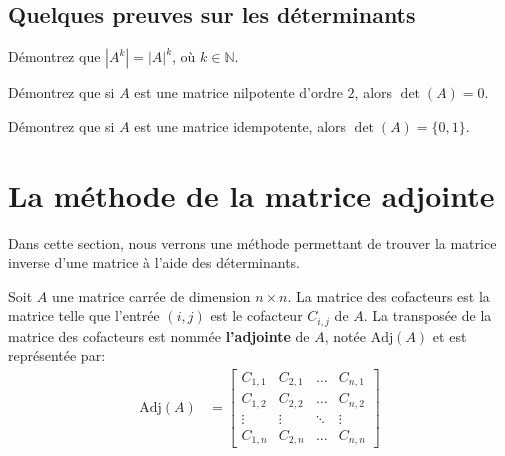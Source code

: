 \documentclass[]{book}
\theoremstyle{definition}
\theoremstyle{definition}
\theoremstyle{definition}
\theoremstyle{remark}
\let\BeginKnitrBlock\begin \let\EndKnitrBlock\end
\begin{document}
\hypertarget{quelques-preuves-sur-les-duxe9terminants}{%
\subsection{Quelques preuves sur les déterminants}\label{quelques-preuves-sur-les-duxe9terminants}}

\BeginKnitrBlock{example}
\protect\hypertarget{exm:unnamed-chunk-109}{}{\label{exm:unnamed-chunk-109} }Démontrez que \(|A^k| = |A|^k\), où \(k\in\mathbb{N}\).
\EndKnitrBlock{example}

\BeginKnitrBlock{example}
\protect\hypertarget{exm:unnamed-chunk-110}{}{\label{exm:unnamed-chunk-110} }Démontrez que si \(A\) est une matrice nilpotente d'ordre \(2\), alors \(\det(A)=0\).
\EndKnitrBlock{example}

\BeginKnitrBlock{example}
\protect\hypertarget{exm:unnamed-chunk-111}{}{\label{exm:unnamed-chunk-111} }Démontrez que si \(A\) est une matrice idempotente, alors \(\det(A)=\{0,1\}\).
\EndKnitrBlock{example}

\hypertarget{la-muxe9thode-de-la-matrice-adjointe}{%
\section{La méthode de la matrice adjointe}\label{la-muxe9thode-de-la-matrice-adjointe}}

Dans cette section, nous verrons une méthode permettant de trouver la matrice inverse d'une matrice à l'aide des déterminants.

\BeginKnitrBlock{definition}[L'adjointe de la matrice $A$]
\protect\hypertarget{def:unnamed-chunk-112}{}{\label{def:unnamed-chunk-112} {} }Soit \(A\) une matrice carrée de dimension \(n \times n\). La matrice des cofacteurs est la matrice telle que l'entrée \((i,j)\) est le cofacteur \(C_{i,j}\) de \(A\). La transposée de la matrice des cofacteurs est nommée \textbf{l'adjointe} de \(A\), notée \(\text{Adj}(A)\) et est représentée par:
\begin{align*}
\text{Adj}(A) &= \begin{bmatrix}
C_{1,1} & C_{2,1} & \ldots & C_{n,1} \\
C_{1,2} & C_{2,2} & \ldots & C_{n,2} \\
\vdots & \vdots & \ddots & \vdots \\
C_{1,n} & C_{2,n} & \ldots & C_{n,n}
\end{bmatrix}
\end{align*}
\EndKnitrBlock{definition}
\end{document}
